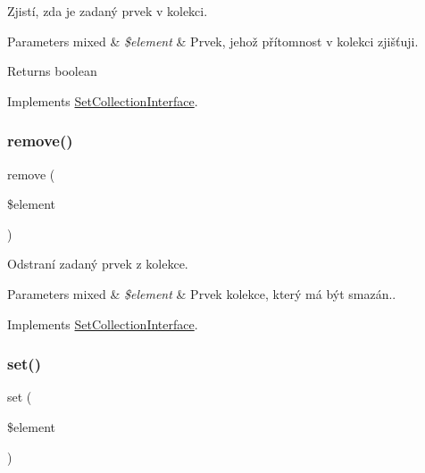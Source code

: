 Zjistí, zda je zadaný prvek v kolekci. 
\begin{DoxyParams}[1]{Parameters}
mixed & {\em \$element} & Prvek, jehož přítomnost v kolekci zjišťuji. \\
\hline
\end{DoxyParams}
\begin{DoxyReturn}{Returns}
boolean 
\end{DoxyReturn}


Implements \mbox{\hyperlink{interface_pes_1_1_collection_1_1_set_collection_interface}{Set\+Collection\+Interface}}.

\mbox{\label{class_pes_1_1_collection_1_1_set_collection_a4e710ba89e011dd21d20b53b742ab1bc}} 
\subsubsection{\texorpdfstring{remove()}{remove()}}
{\footnotesize\ttfamily remove (\begin{DoxyParamCaption}\item[{}]{\$element }\end{DoxyParamCaption})}

Odstraní zadaný prvek z kolekce. 
\begin{DoxyParams}[1]{Parameters}
mixed & {\em \$element} & Prvek kolekce, který má být smazán.. \\
\hline
\end{DoxyParams}


Implements \mbox{\hyperlink{interface_pes_1_1_collection_1_1_set_collection_interface}{Set\+Collection\+Interface}}.

\mbox{\label{class_pes_1_1_collection_1_1_set_collection_a5cc5bdebebc52ea83f1e130cdf8d8d2d}} 
\subsubsection{\texorpdfstring{set()}{set()}}
{\footnotesize\ttfamily set (\begin{DoxyParamCaption}\item[{}]{\$element }\end{DoxyParamCaption})}

